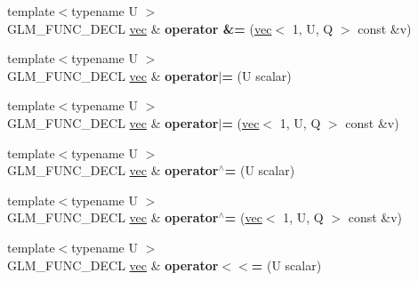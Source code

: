 \begin{DoxyCompactItemize}
{\footnotesize template$<$typename U $>$ }\\G\+L\+M\+\_\+\+F\+U\+N\+C\+\_\+\+D\+E\+CL \hyperlink{structglm_1_1vec}{vec} \& {\bfseries operator \&=} (\hyperlink{structglm_1_1vec}{vec}$<$ 1, U, Q $>$ const \&v)
\item 
\mbox{\label{structglm_1_1vec_3_011_00_01T_00_01Q_01_4_a4461fe7917c4bf548c2cc8f0e331fa4d}} 
{\footnotesize template$<$typename U $>$ }\\G\+L\+M\+\_\+\+F\+U\+N\+C\+\_\+\+D\+E\+CL \hyperlink{structglm_1_1vec}{vec} \& {\bfseries operator$\vert$=} (U scalar)
\item 
\mbox{\label{structglm_1_1vec_3_011_00_01T_00_01Q_01_4_ab4a630f41cedd0b2e443326231a53dd3}} 
{\footnotesize template$<$typename U $>$ }\\G\+L\+M\+\_\+\+F\+U\+N\+C\+\_\+\+D\+E\+CL \hyperlink{structglm_1_1vec}{vec} \& {\bfseries operator$\vert$=} (\hyperlink{structglm_1_1vec}{vec}$<$ 1, U, Q $>$ const \&v)
\item 
\mbox{\label{structglm_1_1vec_3_011_00_01T_00_01Q_01_4_adc1d8c73a25f303593984181492ca504}} 
{\footnotesize template$<$typename U $>$ }\\G\+L\+M\+\_\+\+F\+U\+N\+C\+\_\+\+D\+E\+CL \hyperlink{structglm_1_1vec}{vec} \& {\bfseries operator$^\wedge$=} (U scalar)
\item 
\mbox{\label{structglm_1_1vec_3_011_00_01T_00_01Q_01_4_a5eb7b272edca8d8ab181dc5df3c7beb1}} 
{\footnotesize template$<$typename U $>$ }\\G\+L\+M\+\_\+\+F\+U\+N\+C\+\_\+\+D\+E\+CL \hyperlink{structglm_1_1vec}{vec} \& {\bfseries operator$^\wedge$=} (\hyperlink{structglm_1_1vec}{vec}$<$ 1, U, Q $>$ const \&v)
\item 
\mbox{\label{structglm_1_1vec_3_011_00_01T_00_01Q_01_4_a5d80ce8ed40a0461965798ddc60f8dc5}} 
{\footnotesize template$<$typename U $>$ }\\G\+L\+M\+\_\+\+F\+U\+N\+C\+\_\+\+D\+E\+CL \hyperlink{structglm_1_1vec}{vec} \& {\bfseries operator$<$$<$=} (U scalar)
\item 
\mbox{\label{structglm_1_1vec_3_011_00_01T_00_01Q_01_4_ad853df2a061ac3e3676e34dfd1f7afd8}} 

\end{DoxyCompactItemize}
